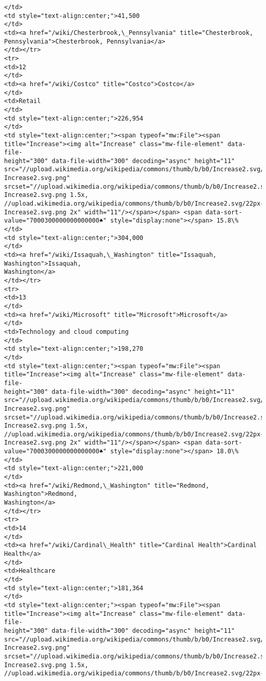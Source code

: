 \documentclass[11pt]{article}
\begin{document}
\begin{Verbatim}[commandchars=\\\{\}]
</td>
<td style="text-align:center;">41,500
</td>
<td><a href="/wiki/Chesterbrook,\_Pennsylvania" title="Chesterbrook,
Pennsylvania">Chesterbrook, Pennsylvania</a>
</td></tr>
<tr>
<td>12
</td>
<td><a href="/wiki/Costco" title="Costco">Costco</a>
</td>
<td>Retail
</td>
<td style="text-align:center;">226,954
</td>
<td style="text-align:center;"><span typeof="mw:File"><span
title="Increase"><img alt="Increase" class="mw-file-element" data-file-
height="300" data-file-width="300" decoding="async" height="11"
src="//upload.wikimedia.org/wikipedia/commons/thumb/b/b0/Increase2.svg/11px-
Increase2.svg.png"
srcset="//upload.wikimedia.org/wikipedia/commons/thumb/b/b0/Increase2.svg/17px-
Increase2.svg.png 1.5x,
//upload.wikimedia.org/wikipedia/commons/thumb/b/b0/Increase2.svg/22px-
Increase2.svg.png 2x" width="11"/></span></span> <span data-sort-
value="7000300000000000000♠" style="display:none"></span> 15.8\%
</td>
<td style="text-align:center;">304,000
</td>
<td><a href="/wiki/Issaquah,\_Washington" title="Issaquah, Washington">Issaquah,
Washington</a>
</td></tr>
<tr>
<td>13
</td>
<td><a href="/wiki/Microsoft" title="Microsoft">Microsoft</a>
</td>
<td>Technology and cloud computing
</td>
<td style="text-align:center;">198,270
</td>
<td style="text-align:center;"><span typeof="mw:File"><span
title="Increase"><img alt="Increase" class="mw-file-element" data-file-
height="300" data-file-width="300" decoding="async" height="11"
src="//upload.wikimedia.org/wikipedia/commons/thumb/b/b0/Increase2.svg/11px-
Increase2.svg.png"
srcset="//upload.wikimedia.org/wikipedia/commons/thumb/b/b0/Increase2.svg/17px-
Increase2.svg.png 1.5x,
//upload.wikimedia.org/wikipedia/commons/thumb/b/b0/Increase2.svg/22px-
Increase2.svg.png 2x" width="11"/></span></span> <span data-sort-
value="7000300000000000000♠" style="display:none"></span> 18.0\%
</td>
<td style="text-align:center;">221,000
</td>
<td><a href="/wiki/Redmond,\_Washington" title="Redmond, Washington">Redmond,
Washington</a>
</td></tr>
<tr>
<td>14
</td>
<td><a href="/wiki/Cardinal\_Health" title="Cardinal Health">Cardinal Health</a>
</td>
<td>Healthcare
</td>
<td style="text-align:center;">181,364
</td>
<td style="text-align:center;"><span typeof="mw:File"><span
title="Increase"><img alt="Increase" class="mw-file-element" data-file-
height="300" data-file-width="300" decoding="async" height="11"
src="//upload.wikimedia.org/wikipedia/commons/thumb/b/b0/Increase2.svg/11px-
Increase2.svg.png"
srcset="//upload.wikimedia.org/wikipedia/commons/thumb/b/b0/Increase2.svg/17px-
Increase2.svg.png 1.5x,
//upload.wikimedia.org/wikipedia/commons/thumb/b/b0/Increase2.svg/22px-

\end{Verbatim}
\end{document}
